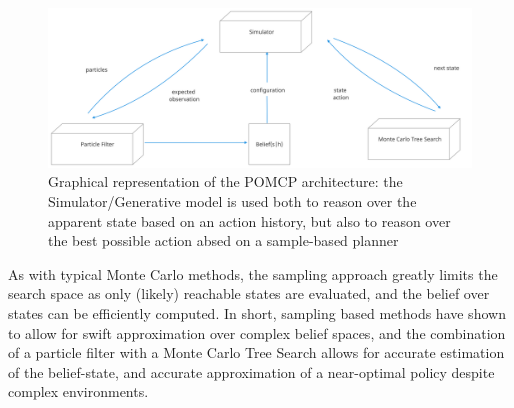 \begin{figure}
    \caption{Graphical representation of the POMCP architecture: the Simulator/Generative model is used both to reason over the apparent state based on an action history, but also to reason over the best possible action absed on a sample-based planner}
    \includegraphics[width=\textwidth]{Figures/POMCP.png}
    \centering  
\end{figure}

As with typical Monte Carlo methods, the sampling approach greatly limits the search space as only (likely) reachable states are evaluated, and the belief over states can be efficiently computed. In short, sampling based methods have shown to allow for swift approximation over complex belief spaces, and the combination of a particle filter with a Monte Carlo Tree Search allows for accurate estimation of the belief-state, and accurate approximation of a near-optimal policy despite complex environments.

